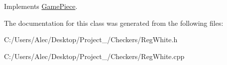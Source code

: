 Implements \hyperlink{class_game_piece}{Game\-Piece}.



The documentation for this class was generated from the following files\-:\begin{DoxyCompactItemize}
\item 
C\-:/\-Users/\-Alec/\-Desktop/\-Project\-\_/\-Checkers/Reg\-White.\-h\item 
C\-:/\-Users/\-Alec/\-Desktop/\-Project\-\_/\-Checkers/Reg\-White.\-cpp\end{DoxyCompactItemize}
